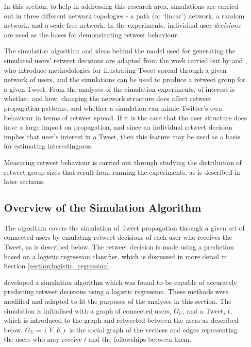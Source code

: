 In this section, to help in addressing this research area, simulations are carried out in three different network topologies - a path (or `linear') network, a random network, and a scale-free network. In the experiments, individual user \textit{decisions} are used as the bases for demonstrating retweet behaviour.  

The simulation algorithm and ideas behind the model used for generating the simulated users' retweet decisions are adapted from the work carried out by \citet{zhu11} and \citet{peng11}, who introduce methodologies for illustrating Tweet spread through a given network of users, and the simulations can be used to produce a retweet group for a given Tweet. From the analyses of the simulation experiments, of interest is whether, and how, changing the network structure does affect retweet propagation patterns, and whether a simulation can mimic Twitter's own behaviour in terms of retweet spread. If it is the case that the user structure does have a large impact on propagation, and since an individual retweet decision implies that user's interest in a Tweet, then this feature may be used as a basis for estimating interestingness. 

Measuring retweet behaviour is carried out through studying the distribution of retweet group sizes that result from running the experiments, as is described in later sections.

\subsection{Overview of the Simulation Algorithm}
The algorithm covers the simulation of Tweet propagation through a given set of connected users by emulating retweet decisions of each user who receives the Tweet, as is described below. The retweet decision is made using a prediction based on a logistic regression classifier, which is discussed in more detail in Section \ref{section:logistic_regression}.

\citet{zhu11} developed a simulation algorithm which was found to be capable of accurately predicting retweet decisions using a logistic regression. These methods were modified and adapted to fit the purposes of the analyses in this section. The simulation is initialised with a graph of connected users, $G_U$, and a Tweet, $t$, which is introduced to the graph and retweeted between the users as described below. $G_U = (V,E)$ is the social graph of the vertices and edges representing the users who may receive $t$ and the followships between them.

